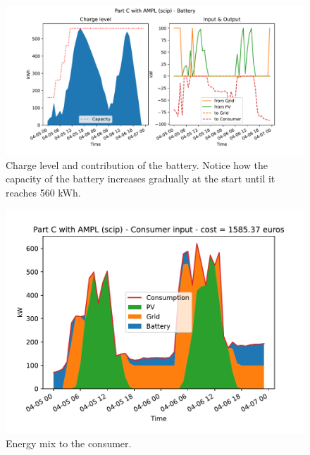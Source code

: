 \documentclass[12pt]{article}
\begin{document}
\begin{figure}[p]
    \centering
    \includegraphics[width=\textwidth]{figs/PartC/battery}
    \caption{Charge level and contribution of the battery. Notice how the capacity of the battery increases gradually at the start until it reaches 560 kWh.}
\end{figure}

\begin{figure}[p]
    \centering
    \includegraphics[width=\textwidth]{figs/PartC/consumer_input}
    \caption{Energy mix to the consumer.}
\end{figure}
\end{document}
